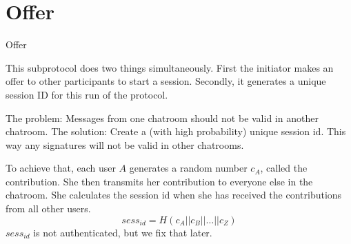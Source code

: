 \section{Offer}
\begin{frame}
\Huge{\centerline{Offer}}
\end{frame}

\begin{frame}
  This subprotocol does two things simultaneously.
  \vfill
  First the initiator makes an offer to other participants to start a session.
  \vfill
  Secondly, it generates a unique session ID for this run of the protocol.
\end{frame}

\begin{frame}
  The problem: Messages from one chatroom should not be valid in another chatroom.
  \vfill
  The solution: Create a (with high probability) unique session id. This way any signatures will not be valid in other chatrooms.

\end{frame}

\begin{frame}
  To achieve that, each user $A$ generates a random number $c_A$, called the contribution.
  \vfill
  She then transmits her contribution to everyone else in the chatroom.
  \vfill
  She calculates the session id when she has received the contributions from all other users.
  \[
      sess_{id} = H(c_A || c_B || \dots || c_Z)
  \]
  \vfill
  $sess_{id}$ is not authenticated, but we fix that later.
\end{frame}
